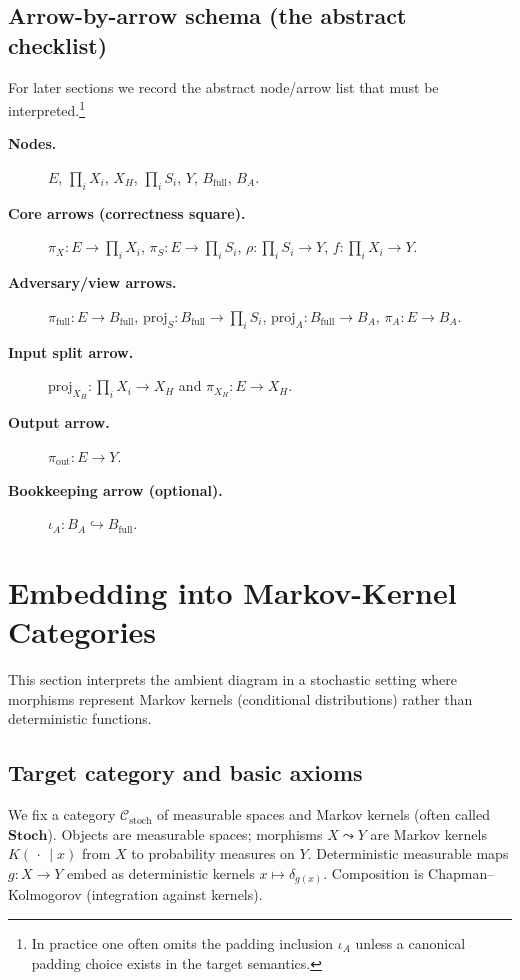 \documentclass[11pt,a4paper]{article}
\theoremstyle{definition}
\theoremstyle{plain}
\begin{document}
\subsection{Arrow-by-arrow schema (the abstract checklist)}
\label{subsec:abstract-checklist}
For later sections we record the abstract node/arrow list that must be interpreted.\footnote{In practice one often omits the padding inclusion $\iota_A$ unless a canonical padding choice exists in the target semantics.}
\begin{description}
    \item[\textbf{Nodes.}]
    $E$, $\prod_i X_i$, $X_H$, $\prod_i S_i$, $Y$, $B_{\mathrm{full}}$, $B_A$.
    \item[\textbf{Core arrows (correctness square).}]
    $\pi_X:E\to \prod_i X_i$, $\pi_S:E\to \prod_i S_i$, $\rho:\prod_i S_i\to Y$, $f:\prod_i X_i\to Y$.
    \item[\textbf{Adversary/view arrows.}]
    $\pi_{\mathrm{full}}:E\to B_{\mathrm{full}}$, $\mathrm{proj}_S:B_{\mathrm{full}}\to \prod_i S_i$, $\mathrm{proj}_A:B_{\mathrm{full}}\to B_A$, $\pi_A:E\to B_A$.
    \item[\textbf{Input split arrow.}]
    $\mathrm{proj}_{X_H}:\prod_i X_i\to X_H$ and $\pi_{X_H}:E\to X_H$.
    \item[\textbf{Output arrow.}]
    $\pi_{\mathrm{out}}:E\to Y$.
    \item[\textbf{Bookkeeping arrow (optional).}]
    $\iota_A:B_A\hookrightarrow B_{\mathrm{full}}$.
\end{description}

\section{Embedding into Markov-Kernel Categories}
\label{sec:markov}

This section interprets the ambient diagram in a stochastic setting where morphisms represent Markov kernels (conditional distributions) rather than deterministic functions.

\subsection{Target category and basic axioms}
We fix a category $\mathcal{C}_{\mathrm{stoch}}$ of measurable spaces and Markov kernels (often called $\mathbf{Stoch}$).
Objects are measurable spaces; morphisms $X\leadsto Y$ are Markov kernels $K(\,\cdot\,\mid x)$ from $X$ to probability measures on $Y$.
Deterministic measurable maps $g:X\to Y$ embed as deterministic kernels $x\mapsto \delta_{g(x)}$.
Composition is Chapman--Kolmogorov (integration against kernels).
\end{document}
